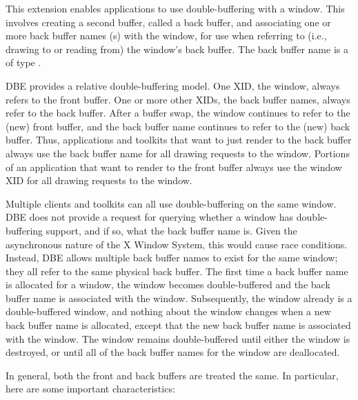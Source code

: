 This extension enables applications to use double-buffering with a
window.  This involves creating a second buffer, called a back buffer,
and associating one or more back buffer names (s) with
the window, for use when referring to (i.e., drawing to or reading
from) the window's back buffer.  The back buffer name is a
 of type .

DBE provides a relative double-buffering model.  One XID, the window,
always refers to the front buffer.  One or more other XIDs, the back buffer
names, always refer to the back buffer.  After a buffer swap, the
window continues to refer to the (new) front buffer, and the
back buffer name continues to refer to the (new) back buffer.  Thus,
applications and toolkits that want to just render to the back buffer
always use the back buffer name for all drawing requests to the
window.  Portions of an application that want to render to the front
buffer always use the window XID for all drawing requests to the
window.

Multiple clients and toolkits can all use double-buffering on the same
window.  DBE does not provide a request for querying whether a window
has double-buffering support, and if so, what the back buffer name is.
Given the asynchronous nature of the X Window System, this would cause
race conditions.  Instead, DBE allows multiple back buffer names to
exist for the same window; they all refer to the same physical back
buffer.  The first time a back buffer name is allocated for a window,
the window becomes double-buffered and the back buffer name is
associated with the window.  Subsequently, the window already is a
double-buffered window, and nothing about the window changes when a
new back buffer name is allocated, except that the new back buffer
name is associated with the window.  The window remains
double-buffered until either the window is destroyed, or until all of
the back buffer names for the window are deallocated.

In general, both the front and back buffers are treated the same.  In
particular, here are some important characteristics:

